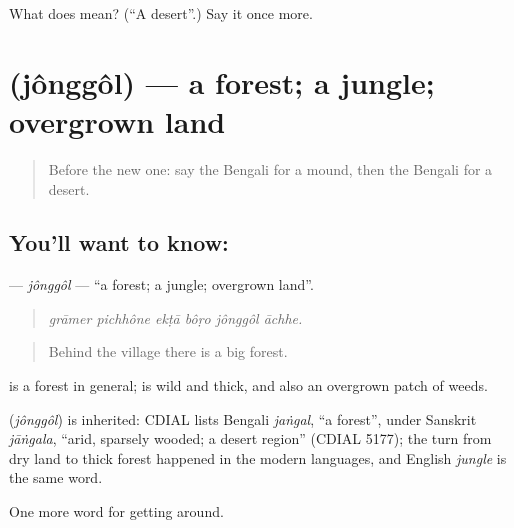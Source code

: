 \begin{tcolorbox}[breakable,colback=teal!4,colframe=teal!35!black,title={Before you move on}]
What does  mean? (\textquotedblleft{}A desert\textquotedblright{}.) Say it once more.
\end{tcolorbox}
\section[\texorpdfstring{\bn{জঙ্গল} (jônggôl)}{জঙ্গল (jônggôl)}]{ (jônggôl) — a forest; a jungle; overgrown land}

\label{lesson:BN-C432-jonggol}



\begin{quote}
Before the new one: say the Bengali for a mound, then the Bengali for a desert.
\end{quote}

\subsection*{You'll want to know: }
\textbf{} — \emph{jônggôl} — \textquotedblleft{}a forest; a jungle; overgrown land\textquotedblright{}.

\begin{quote}
     
\end{quote}

\begin{quote}
\emph{grāmer pichhône ekṭā bôṛo jônggôl āchhe.}
\end{quote}

\begin{quote}
Behind the village there is a big forest.
\end{quote}

 is a forest in general;  is wild and thick, and also an overgrown patch of weeds.

\begin{cousinweb}
\textbf{} (\emph{jônggôl}) is inherited: CDIAL lists Bengali \emph{jaṅgal}, \textquotedblleft{}a forest\textquotedblright{}, under Sanskrit \emph{jāṅgala}, \textquotedblleft{}arid, sparsely wooded; a desert region\textquotedblright{} (CDIAL 5177); the turn from dry land to thick forest happened in the modern languages, and English \emph{jungle} is the same word.
\end{cousinweb}

\begin{grammarlens}[title={What you've built}]
One more word for getting around.
\end{grammarlens}

